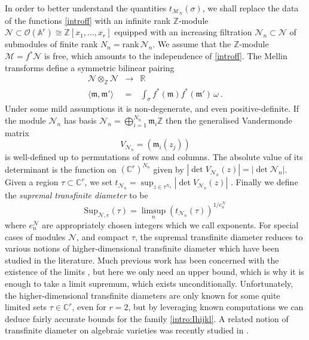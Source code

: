 \documentclass[a4paper,10pt]{amsart}
\theoremstyle{definition}
\theoremstyle{remark}
\numberwithin{equation}{section}
\newcommand{\To}{\longrightarrow}
\newcommand{\Z}{\mathbb Z}
\newcommand{\C}{\mathbb C}
\newcommand{\R}{\mathbb R}
\newcommand{\m}{\mathfrak{m}}
\newcommand{\Or}{\mathcal{O}}
\newcommand{\0}{\color{blue}{\mathsf{0}}}
\begin{document}
In order to better understand the quantities $ t_{\mathcal{M}_N}(\sigma)$, we shall replace the data of the functions \eqref{introff}  with an infinite rank $\Z$-module $\mathcal{N} \subset \Or(\mathbb{A}^r) \cong \Z[x_1,\ldots, x_r]$ equipped with an increasing filtration $\mathcal{N}_n\subset \mathcal{N}$ of submodules of finite rank $N_n = \mathrm{rank} \, \mathcal{N}_n$. We assume that the $\Z$-module $\mathcal{M}=f^* \mathcal{N}$ is free, which amounts to the independence of \eqref{introff}.  
The Mellin transforms define a symmetric  bilinear pairing
\begin{eqnarray}  \mathcal{N}  \otimes_{\Z} \mathcal{N} & \To&  \R \nonumber \\ 
  \langle \m  ,   \m'  \rangle  & = &  \int_{\sigma}  f^*(\m) f^*(\m') \, \omega  \ . \nonumber 
  \end{eqnarray}
Under some mild assumptions it is non-degenerate, and even positive-definite. If the module $\mathcal{N}_n$ has basis $\mathcal{N}_n = \bigoplus_{i=1}^{N_n} \m_i \Z$ then the generalised Vandermonde matrix
\[ V_{\mathcal{N}_n}  =( \m_i(z_j)) \]
is well-defined up to permutations of rows and columns. The absolute value of its  determinant is the function  on $(\C^r)^{N_n}$ given by 
$| \det V_{\mathcal{N}_n}(z)  | =  | \det \mathcal{N}_n|$. 
  Given a region $\tau \subset \C^r$, we set $t_{\mathcal{N}_n} = \sup_{z\in \tau^{N_n}} | \det V_{\mathcal{N}_n}(z)  | $ . Finally we define the \emph{supremal transfinite diameter} to be
  \begin{equation} \label{intro:suptau}   \mathrm{Sup}_{\mathcal{N},e} (\tau) = \limsup_n   \left(t_{\mathcal{N}_n} (\tau)\right)^{1/e^{\mathcal{N}}_n}\end{equation}
  where $e^{\mathcal{N}}_n$ are appropriately chosen integers which we call exponents.  For special cases of modules $\mathcal{N}$, and compact $\tau$, the supremal transfinite diameter reduces to various notions of higher-dimensional transfinite diameter which have been studied in the literature.  Much previous work has been concerned with the existence   of the limits \cite{Zaharjuta}, but  here we only need an upper bound, which is why it is enough to take a limit supremum, which exists unconditionally. Unfortunately,  the higher-dimensional transfinite diameters are only known for some quite limited sets $\tau \in \C^r$,  even for $r=2$, but by leveraging known computations  we can deduce fairly  accurate bounds for the family \eqref{intro:Ihijkl}.  A related notion of transfinite diameter on algebraic varieties 
 was recently studied in   \cite{Mau, CoxMau}. 
  
\end{document}
